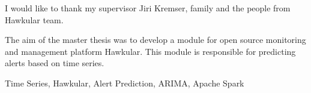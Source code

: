 \documentclass[12pt,oneside]{fithesis2}
\begin{document}
\FrontMatter                    %
\ThesisTitlePage                %
\begin{ThesisDeclaration}       %
  \DeclarationText
  \AdvisorName
\end{ThesisDeclaration}

\begin{ThesisThanks}            %
  I would like to thank my supervisor Jiri Kremser, family and 
  the people from Hawkular team.
\end{ThesisThanks}

\begin{ThesisAbstract}          %
  The aim of the master thesis was to develop a module for open source monitoring
  and management platform Hawkular. This module is responsible for predicting
  alerts based on time series. 
\end{ThesisAbstract}

\begin{ThesisKeyWords}          %
  Time Series, Hawkular, Alert Prediction, ARIMA, Apache Spark
\end{ThesisKeyWords}

\tableofcontents                %

\MainMatter                     %

    
\end{document}
